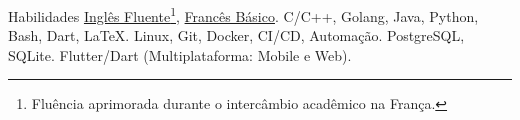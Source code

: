 
\begin{rubric}{Habilidades}
\entry*[Línguas]
    \href{https://drive.google.com/file/d/1PTySqO2pdP8BjxMf1Vgrz0EzpBxw9jYq/view?usp=sharing}{Inglês Fluente}\footnote{Fluência aprimorada durante o intercâmbio acadêmico na França.},
    \href{https://drive.google.com/file/d/1yjeEiOAcLmwbUxXELqplRyCWaUSi7e8C/view?usp=sharing}{Francês Básico}.
\entry*[Programação]
    C/C++, Golang, Java, Python, Bash, Dart, \LaTeX.
    Linux, Git, Docker, CI/CD, Automação.
    PostgreSQL, SQLite.
\entry*[Desenvolvimento]
    Flutter/Dart (Multiplataforma: Mobile e Web).
\end{rubric}

